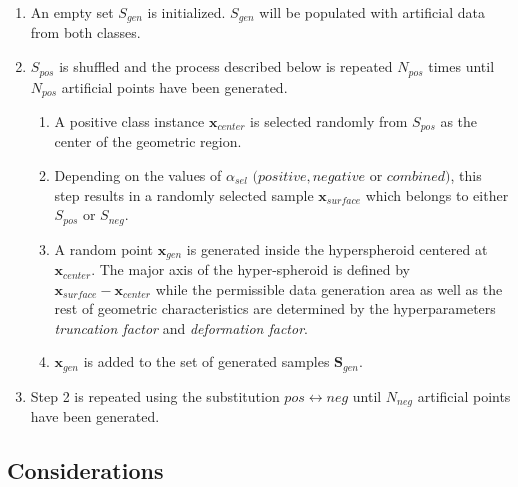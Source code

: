 \begin{enumerate}

\renewcommand{\labelenumii}{\theenumii}
\renewcommand{\theenumii}{\theenumi.\arabic{enumii}.}

	\item An empty set \( S_{gen} \) is initialized. \( S_{gen} \) will be populated with artificial data from both classes.

	\item \( S_{pos} \) is shuffled and the process described below is repeated \( N_{pos} \) times until \( N_{pos} \) artificial points have been generated.

	\begin{enumerate}

		\item A positive class instance \( \textbf{x}_{center} \) is selected randomly from \( S_{pos} \) as the center of the geometric region.

		\item Depending on the values of \( \alpha_{sel} \) \( (positive, negative \) or \( combined) \), this step results in a randomly selected sample \(\textbf{x}_{surface} \) which belongs to either \( S_{pos} \) or \( S_{neg} \).

		\item A random point \(\textbf{x}_{gen} \) is generated inside the hyperspheroid centered at \( \textbf{x}_{center} \). The major axis of the hyper-spheroid is defined by \( \textbf{x}_{surface} - \textbf{x}_{center} \) while the permissible data generation area as well as the rest of geometric characteristics are determined by the hyperparameters \textit{truncation factor} and \textit{deformation factor}.

		\item \( \textbf{x}_{gen} \) is added to the set of generated samples
		\( \textbf{S}_{gen} \).
	
	\end{enumerate}

	\item Step 2 is repeated using the substitution \( pos \leftrightarrow neg \) until \( N_{neg} \) artificial points have been generated.

\end{enumerate}

\subsection{Considerations}

